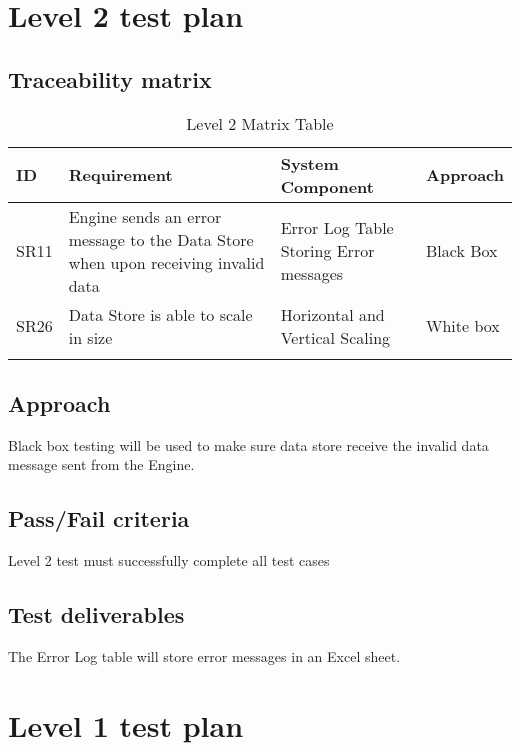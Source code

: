 \documentclass[letterpaper,12pt,oneside,listof=totoc]{scrreprt}
\begin{document}
\section{Level 2 test plan}

\subsection{Traceability matrix}
\begin{longtable}{ p{} |  p{} | p{} | p{} }
\hline
\textbf{ID} & \textbf{Requirement} & \textbf{System Component} & \textbf{Approach}  \\
\hline
SR11 & Engine sends an error message to the Data Store when upon receiving invalid data & Error Log Table Storing Error messages & Black Box\\
\hline
SR26 & Data Store is able to scale in size & Horizontal and Vertical Scaling & White box\\
\hline
\caption{Level 2 Matrix Table}
\label{Level 2 Matrix Table}
\end{longtable}

\subsection{Approach}
Black box testing will be used to make sure data store receive the invalid data message sent from the Engine.

\subsection{Pass/Fail criteria}
Level 2 test must successfully complete all test cases

\subsection{Test deliverables}
The Error Log table will store error messages in an Excel sheet. 




\section{Level 1 test plan}
\end{document}
